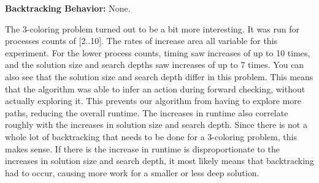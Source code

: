 {\bf Backtracking Behavior:} None.

The 3-coloring problem turned out to be a bit more interesting.  It was run for processes counts of [2..10].  The rates of increase area all variable
for this experiment.  For the lower process counts, timing saw increases of up to 10 times, and the solution size and search depths saw increases
of up to 7 times.  You can also see that the solution size and search depth differ in this problem.  This means that the algorithm was able to infer
an action during forward checking, without actually exploring it.  This prevents our algorithm from having to explore more paths, reducing the overall
runtime.  The increases in runtime also correlate roughly with the increases in solution size and search depth.  Since there is not a whole lot
of backtracking that needs to be done for a 3-coloring problem, this makes sense.  If there is the increase in runtime is disproportionate to the
increases in solution size and search depth, it most likely means that backtracking had to occur, causing more work for a smaller or less deep
solution.

\newpage

